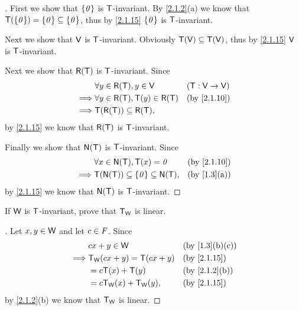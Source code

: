 \begin{proof}[]
  First we show that \(\left\lbrace\mathit{0}\right\rbrace\) is \(\mathsf{T}\)-invariant.
  By \cref{2.1.2}(a) we know that \(\mathsf{T}(\left\lbrace\mathit{0}\right\rbrace) = \left\lbrace\mathit{0}\right\rbrace \subseteq \left\lbrace\mathit{0}\right\rbrace\), thus by \cref{2.1.15} \(\left\lbrace\mathit{0}\right\rbrace\) is \(\mathsf{T}\)-invariant.

  Next we show that \(\mathsf{V}\) is \(\mathsf{T}\)-invariant.
  Obviously \(\mathsf{T}(\mathsf{V}) \subseteq \mathsf{T}(\mathsf{V})\), thus by \cref{2.1.15} \(\mathsf{V}\) is \(\mathsf{T}\)-invariant.

  Next we show that \(\rg{\T}\) is \(\mathsf{T}\)-invariant.
  Since
  \begin{align*}
             & \forall y \in \rg{\T}, y \in \V          &  & (\T : \V \to \V)          \\
    \implies & \forall y \in \rg{\T}, \T(y) \in \rg{\T} &  & \text{(by \cref{2.1.10})} \\
    \implies & \T(\rg{\T}) \subseteq \rg{\T},
  \end{align*}
  by \cref{2.1.15} we know that \(\rg{\T}\) is \(\mathsf{T}\)-invariant.

  Finally we show that \(\ns{\T}\) is \(\mathsf{T}\)-invariant.
  Since
  \begin{align*}
             & \forall x \in \ns{\T}, \T(x) = \zv                 &  & \text{(by \cref{2.1.10})} \\
    \implies & \T(\ns{\T}) \subseteq \set{\zv} \subseteq \ns{\T}, &  & \text{(by \cref{1.3}(a))}
  \end{align*}
  by \cref{2.1.15} we know that \(\ns{\T}\) is \(\mathsf{T}\)-invariant.
\end{proof}

\begin{ex}\label{ex:2.1.29}
  If \(\mathsf{W}\) is \(\mathsf{T}\)-invariant, prove that \(\mathsf{T}_{\mathsf{W}}\) is linear.
\end{ex}

\begin{proof}[]
  Let \(x, y \in \mathsf{W}\) and let \(c \in \mathit{F}\).
  Since
  \begin{align*}
             & cx + y \in \W                &  & \text{(by \cref{1.3}(b)(c))} \\
    \implies & \T_{\W}(cx + y) = \T(cx + y) &  & \text{(by \cref{2.1.15})}    \\
             & = c \T(x) + \T(y)            &  & \text{(by \cref{2.1.2}(b))}  \\
             & = c \T_{\W}(x) + \T_{\W}(y), &  & \text{(by \cref{2.1.15})}
  \end{align*}
  by \cref{2.1.2}(b) we know that \(\mathsf{T}_{\mathsf{W}}\) is linear.
\end{proof}

